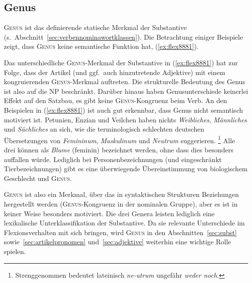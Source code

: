\subsection{Genus}


\textsc{Genus} ist das definierende statische Merkmal der Substantive (s.\ Abschnitt~\ref{sec:verbennominawortklassen}).
Die Betrachtung einiger Beispiele zeigt, dass \textsc{Genus} keine semantische Funktion hat, (\ref{ex:flex8881}).

\begin{exe}
  \ex \label{ex:flex8881}
  \begin{xlist}
  \end{xlist}
\end{exe}

Das unterschiedliche \textsc{Genus}-Merkmal der Substantive in (\ref{ex:flex8881}) hat zur Folge, dass der Artikel (und ggf.\ auch hinzutretende Adjektive) mit einem kongruierenden \textsc{Genus}-Merkmal auftreten.
Die strukturelle Bedeutung des Genus ist also auf die NP beschränkt.
Darüber hinaus haben Genusunterschiede keinerlei Effekt auf den Satzbau, es gibt \zB keine \textsc{Genus}-Kongruenz beim Verb.
 An den Beispielen in (\ref{ex:flex8881}) ist auch gut erkennbar, dass Genus nicht semantisch motiviert ist.
Petunien, Enzian und Veilchen haben nichts \textit{Weibliches}, \textit{Männliches} und \textit{Sächliches} an sich, wie die terminologisch schlechten deutschen Übersetzungen von \textit{Femininum}, \textit{Maskulinum} und \textit{Neutrum} suggerieren.%
\footnote{Strenggenommen bedeutet lateinisch \textit{ne-utrum} ungefähr \textit{weder noch}.}
Alle drei können als \textit{Blume} (feminin) bezeichnet werden, ohne dass dies besonders auffallen würde.
Lediglich bei Personenbezeichnungen (und eingeschränkt Tierbezeichnungen) gibt es eine überwiegende Übereinstimmung von biologischem Geschlecht und \textsc{Genus}.

\textsc{Genus} ist also ein Merkmal, über das in syntaktischen Strukturen Beziehungen hergestellt werden (\textsc{Genus}-Kongruenz in der nominalen Gruppe), aber es ist in keiner Weise besonders motiviert.
Die drei Genera leisten lediglich eine lexikalische Unterklassifikation der Substantive.
Da sie relevante Unterschiede im Flexionsverhalten mit sich bringen, wird \textsc{Genus} in den Abschnitten~\ref{sec:subst} sowie~\ref{sec:artikelpronomen} und~\ref{sec:adjektive} weiterhin eine wichtige Rolle spielen.

